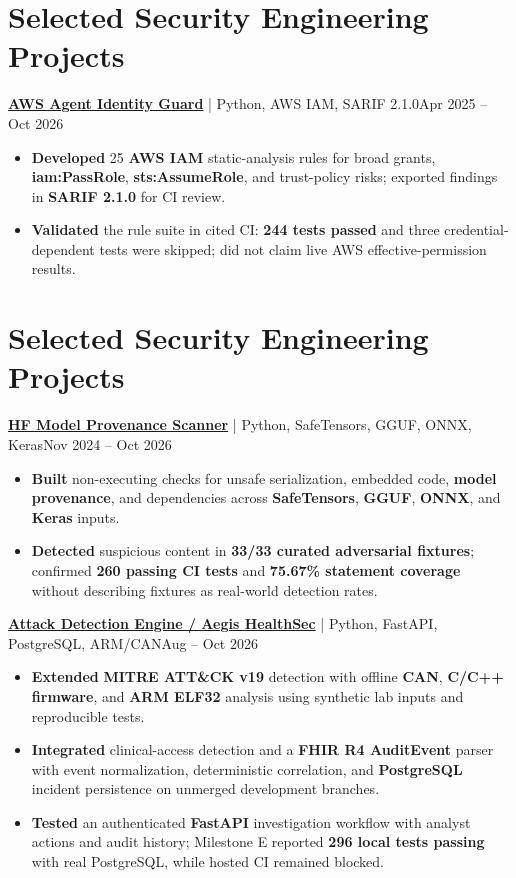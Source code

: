 \documentclass[letterpaper,10pt]{article}
\newcommand{\proj}[3]{\textbf{#1} {\fontsize{10.5}{12.4}\selectfont | #2}\hfill{\fontsize{10.5}{12.4}\selectfont #3}\vspace{2pt}}
\begin{document}
\newpage
\section{Selected Security Engineering Projects}
\proj{\href{https://github.com/poojakira/aws-agent-identity-guard}{AWS Agent Identity Guard}}{Python, AWS IAM, SARIF 2.1.0}{Apr 2025 -- Oct 2026}
\begin{itemize}
\item \textbf{Developed} 25 \textbf{AWS IAM} static-analysis rules for broad grants, \textbf{iam:PassRole}, \textbf{sts:AssumeRole}, and trust-policy risks; exported findings in \textbf{SARIF 2.1.0} for CI review.
\item \textbf{Validated} the rule suite in cited CI: \textbf{244 tests passed} and three credential-dependent tests were skipped; did not claim live AWS effective-permission results.
\end{itemize}

\section{Selected Security Engineering Projects}
\proj{\href{https://github.com/poojakira/hf-model-provenance-scanner}{HF Model Provenance Scanner}}{Python, SafeTensors, GGUF, ONNX, Keras}{Nov 2024 -- Oct 2026}
\begin{itemize}
\item \textbf{Built} non-executing checks for unsafe serialization, embedded code, \textbf{model provenance}, and dependencies across \textbf{SafeTensors}, \textbf{GGUF}, \textbf{ONNX}, and \textbf{Keras} inputs.
\item \textbf{Detected} suspicious content in \textbf{33/33 curated adversarial fixtures}; confirmed \textbf{260 passing CI tests} and \textbf{75.67\% statement coverage} without describing fixtures as real-world detection rates.
\end{itemize}

\proj{\href{https://github.com/poojakira/attack-detection-engine/pull/50}{Attack Detection Engine / Aegis HealthSec}}{Python, FastAPI, PostgreSQL, ARM/CAN}{Aug -- Oct 2026}
\begin{itemize}
\item \textbf{Extended} \textbf{MITRE ATT\&CK v19} detection with offline \textbf{CAN}, \textbf{C/C++ firmware}, and \textbf{ARM ELF32} analysis using synthetic lab inputs and reproducible tests.
\item \textbf{Integrated} clinical-access detection and a \textbf{FHIR R4 AuditEvent} parser with event normalization, deterministic correlation, and \textbf{PostgreSQL} incident persistence on unmerged development branches.
\item \textbf{Tested} an authenticated \textbf{FastAPI} investigation workflow with analyst actions and audit history; Milestone E reported \textbf{296 local tests passing} with real PostgreSQL, while hosted CI remained blocked.
\end{itemize}
\end{document}
